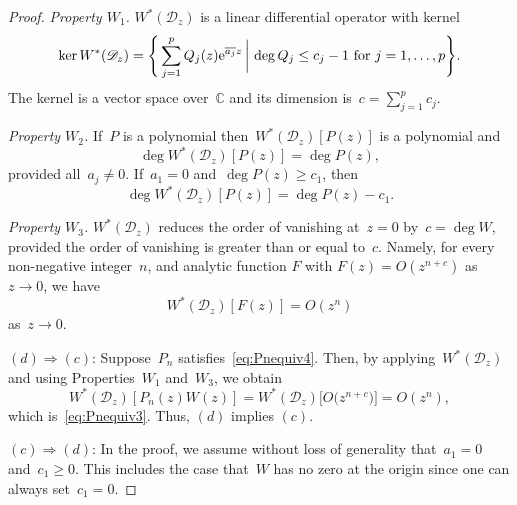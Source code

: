 \documentclass[10pt,a4paper]{article}
\numberwithin{equation}{section}
\newcommand*{\Cset}{\mathbb{C}} %
\begin{document}
\begin{proof}
 \medskip\noindent
 \textit{Property $W_1$.} $W^*(\mathscr{D}_z)$ is a linear differential operator with kernel
 \begin{equation}
 \label{eq:Wproperty1}
 \ker W^*(\mathscr{D}_z) = \Bigg\{ \sum_{j=1}^p Q_j(z) {\rm e}^{\overline{a_j} z} \, \bigg|\, \deg{Q_j} \leq c_j-1 \text{ for } j=1, \dots, p \Bigg\}.
 \end{equation}
 The kernel is a vector space over~$\Cset$ and its dimension is~$c = \sum_{j=1}^p c_j$.

 \medskip\noindent
 \textit{Property $W_2$.}
 If~$P$ is a polynomial then~$W^*(\mathscr{D}_z) [P(z)]$ is a polynomial and
 \begin{equation}
 \label{eq:Wproperty2}
 \deg W^*(\mathscr{D}_z) [P(z)] = \deg P(z),
 \end{equation}
 provided all~$a_j \neq 0$. If~$a_1 =0$ and~$\deg P(z) \geq c_1$, then
 \begin{equation}
 \label{eq:Wproperty2alt}
 \deg W^*(\mathscr{D}_z) [P(z)] = \deg P(z)-c_1.
 \end{equation}

 \medskip\noindent
 \textit{Property $W_3$.} $W^*(\mathscr{D}_z)$ reduces the order of vanishing at~$z=0$ by~$c = \deg W$, provided the order of vanishing is greater than or equal to~$c$. Namely, for every non-negative integer~$n$, and analytic function $F$ with $F(z) = O(z^{n+c})$ as $z \to 0$, we have
 \begin{equation}
 \label{eq:Wproperty3}
 W^*(\mathscr{D}_z) [ F(z) ] = O(z^n)
 \end{equation}
 as~$z \to 0$.

 \smallskip\noindent
 $(d) \Rightarrow (c)$:
 Suppose~$P_n$ satisfies~\eqref{eq:Pnequiv4}. Then, by applying~$W^*(\mathscr{D}_z)$ and using Properties~$W_1$ and~$W_3$, we obtain
 \begin{equation}
 W^*(\mathscr{D}_z) [P_n(z) W(z)] = W^*(\mathscr{D}_z) \big[ O\big(z^{n+c}\big)\big] = O(z^n),
 \end{equation}
 which is~\eqref{eq:Pnequiv3}. Thus, $(d)$ implies $(c)$.

 \smallskip\noindent
$(c) \Rightarrow (d)$:
 In the proof, we assume without loss of generality that~$a_1 =0$ and~$c_1 \geq 0$. This includes the case that~$W$ has no zero at the origin since one can always set~$c_1=0$.


\end{proof}
\end{document}
